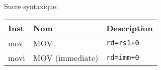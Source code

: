 \documentclass[a4paper]{article}
\begin{document}
    Sucre syntaxique:\\
    \begin{tabular}{|l|l|l|}
        \hline
        Inst & Nom             & Description       \\
        \hline
        mov  & MOV             & \texttt{rd=rs1+0} \\
        movi & MOV (immediate) & \texttt{rd=imm+0} \\
        \hline
    \end{tabular}
\end{document}
